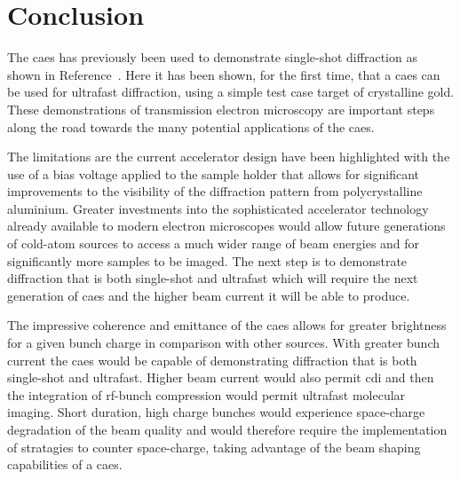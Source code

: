 \section{Conclusion}

The \gls{caes} has previously been used to demonstrate single-shot diffraction as shown in Reference~\cite{speirs_single-shot_2015}.
Here it has been shown, for the first time, that a \gls{caes} can be used for ultrafast diffraction, using a simple test case target of crystalline gold.
These demonstrations of transmission electron microscopy are important steps along the road towards the many potential applications of the \gls{caes}.

The limitations are the current accelerator design have been highlighted with the use of a bias voltage applied to the sample holder that allows for significant improvements to the visibility of the diffraction pattern from polycrystalline aluminium.
Greater investments into the sophisticated accelerator technology already available to modern electron microscopes would allow future generations of cold-atom sources to access a much wider range of beam energies and for significantly more samples to be imaged.
The next step is to demonstrate diffraction that is both single-shot and ultrafast which will require the next generation of \gls{caes} and the higher beam current it will be able to produce.

The impressive coherence and emittance of the \gls{caes} allows for greater brightness for a given bunch charge in comparison with other sources.
With greater bunch current the \gls{caes} would be capable of demonstrating diffraction that is both single-shot and ultrafast.
Higher beam current would also permit \gls{cdi} and then the integration of rf-bunch compression would permit ultrafast molecular imaging.
Short duration, high charge bunches would experience space-charge degradation of the beam quality and would therefore require the implementation of stratagies to counter space-charge, taking advantage of the beam shaping capabilities of a \gls{caes}.